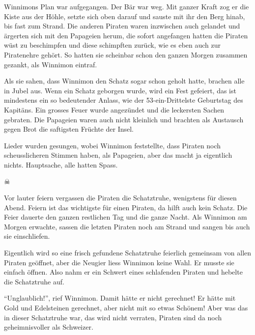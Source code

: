 Winnimons Plan war aufgegangen. Der Bär war weg. Mit ganzer Kraft zog er die Kiste aus der Höhle, setzte sich oben darauf und sauste mit ihr den Berg hinab, bis fast zum Strand. Die anderen Piraten waren inzwischen auch gelandet und ärgerten sich mit den Papageien herum, die sofort angefangen hatten die Piraten wüst zu beschimpfen und diese schimpften zurück, wie es eben auch zur Piratenehre gehört. So hatten sie scheinbar schon den ganzen Morgen zusammen gezankt, als Winnimon eintraf.

Als sie sahen, dass Winnimon den Schatz sogar schon geholt hatte, brachen alle in Jubel aus. Wenn ein Schatz geborgen wurde, wird ein Fest gefeiert, das ist mindestens ein so bedeutender Anlass, wie der 53-ein-Drittelste Geburtstag des Kapitäns. Ein grosses Feuer wurde angezündet und die leckersten Sachen gebraten. Die Papageien waren auch nicht kleinlich und brachten als Austausch gegen Brot die saftigsten Früchte der Insel. 

Lieder wurden gesungen, wobei Winnimon feststellte, dass Piraten noch scheusslicheren Stimmen haben, als Papageien, aber das macht ja eigentlich nichts. Hauptsache, alle hatten Spass.


\begin{center}
{ $\skull$}
\end{center}

Vor lauter feiern vergassen die Piraten die Schatztruhe, wenigstens für diesen Abend. Feiern ist das wichtigste für einen Piraten, da hilft auch kein Schatz. Die Feier dauerte den ganzen restlichen Tag und die ganze Nacht. Als Winnimon am Morgen erwachte, sassen die letzten Piraten noch am Strand und sangen bis auch sie einschliefen.

Eigentlich wird so eine frisch gefundene Schatztruhe feierlich gemeinsam von allen Piraten geöffnet, aber die Neugier liess Winnimon keine Wahl. Er musste sie einfach öffnen. Also nahm er ein Schwert eines schlafenden Piraten und hebelte die Schatztruhe auf.

\enquote{Unglaublich!}, rief Winnimon. Damit hätte er nicht gerechnet! Er hätte mit Gold und Edelsteinen gerechnet, aber nicht mit so etwas Schönem! Aber was das in dieser Schatztruhe war, das wird nicht verraten, Piraten sind da noch geheimnisvoller als Schweizer. \hfill {\color{red}\decofourleft}
